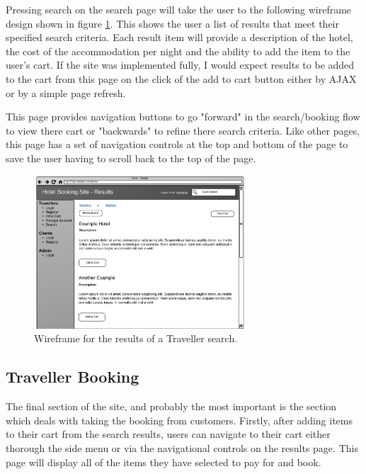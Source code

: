 \documentclass{article}
\begin{document}
Pressing search on the search page will take the user to the following wireframe design shown in figure \ref{fig:wireframe-traveller-results}. This shows the user a list of results that meet their specified search criteria. Each result item will provide a description of the hotel, the cost of the accommodation per night and the ability to add the item to the user's cart. If the site was implemented fully, I would expect results to be added to the cart from this page on the click of the add to cart button either by AJAX or by a simple page refresh. 

This page provides navigation buttons to go "forward" in the search/booking flow to view there cart or "backwards" to refine there search criteria. Like other pages, this page has a set of navigation controls at the top and bottom of the page to save the user having to scroll back to the top of the page.

\begin{figure}[H]
\centering
\includegraphics[width=0.7\textwidth]{img/wireframes/Results.png}
\caption{Wireframe for the results of a Traveller search.}
\label{fig:wireframe-traveller-results}
\end{figure}

\subsection{Traveller Booking}
The final section of the site, and probably the most important is the section which deals with taking the booking from customers. Firstly, after adding items to their cart from the search results, users can navigate to their cart either thorough the side menu or via the navigational controls on the results page. This page will display all of the items they have selected to pay for and book. 
\end{document}
